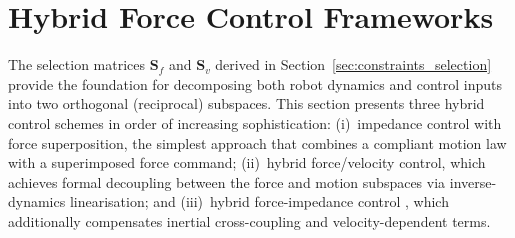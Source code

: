 \documentclass[
	german,%
	accentcolor=9c,%
	ruledheaders=section,%
	class=report,%
	thesis={type=bachelor},%
	fontsize=11pt,%
	parskip=half-,%
	custommargins=true,%
	marginpar=false,%
]{tudapub}
\begin{document}


\section{Hybrid Force Control Frameworks}
\label{sec:hybrid_force_frameworks}

The selection matrices $\mathbf{S}_f$ and $\mathbf{S}_v$ derived in
Section~\ref{sec:constraints_selection} provide the foundation for
decomposing both robot dynamics and control inputs into two orthogonal
(reciprocal) subspaces. This section presents three hybrid control schemes
in order of increasing sophistication: (i)~impedance control with force
superposition, the simplest approach that combines a compliant motion law
with a superimposed force command; (ii)~hybrid force/velocity control\cite{Siciliano_Sciavicco_Villani_Oriolo_2009}, which
achieves formal decoupling between the force and motion subspaces via
inverse-dynamics linearisation; and (iii)~hybrid force-impedance control
\cite{iskandar_hybrid_2023}, which additionally compensates inertial cross-coupling
and velocity-dependent terms. 
\end{document}
